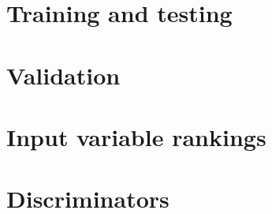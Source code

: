 \section{Training and testing} \label{app:BDTTrainingTesting}


\section{Validation} \label{app:BDTValidation}


\section{Input variable rankings} \label{app:BDTVariableRankings}


\section{Discriminators} \label{app:BDTDiscriminators}
